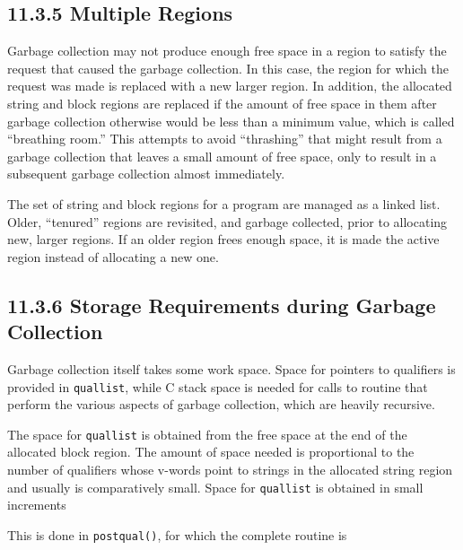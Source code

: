 \subsection[11.3.5 Multiple Regions]{11.3.5 Multiple Regions}

Garbage collection may not produce enough free space in a region to
satisfy the request that caused the garbage collection. In this case,
the region for which the request was made is replaced with a new
larger region. In addition, the allocated string and block regions are
replaced if the amount of free space in them after garbage collection
otherwise would be less than a minimum value, which is called
``breathing room.'' This attempts to avoid ``thrashing'' that might
result from a garbage collection that leaves a small amount of free
space, only to result in a subsequent garbage collection almost
immediately.

The set of string and block regions for a program are managed as a
linked list. Older, ``tenured'' regions are revisited, and garbage
collected, prior to allocating new, larger regions. If an older region
frees enough space, it is made the active region instead of allocating
a new one.

\subsection[11.3.6 Storage Requirements during Garbage Collection]{11.3.6 Storage Requirements during Garbage Collection}

Garbage collection itself takes some work space. Space for pointers to
qualifiers is provided in \texttt{quallist}, while C stack space is
needed for calls to routine that perform the various aspects of
garbage collection, which are heavily recursive.

The space for \texttt{quallist} is obtained from the free space at the
end of the allocated block region. The amount of space needed is
proportional to the number of qualifiers whose v-words point to
strings in the allocated string region and usually is comparatively
small. Space for \texttt{quallist} is obtained in small increments

This is done in \texttt{postqual()}, for which the complete routine is

